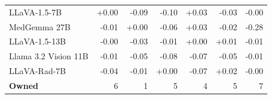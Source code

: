 \begin{table}[t]
{\begin{tabular}{lrrrrrr}
LLaVA-1.5-7B & \cellcolor{cfTerra1}+0.00 & \cellcolor{cfSlate2}-0.09 & \cellcolor{cfSlate2}-0.10 & \cellcolor{cfTerra2}+0.03 & \cellcolor{cfSlate2}-0.03 & \cellcolor{cfSlate1}-0.00 \\
MedGemma 27B & \cellcolor{cfSlate1}-0.01 & \cellcolor{cfTerra1}+0.00 & \cellcolor{cfSlate2}-0.06 & \cellcolor{cfTerra2}+0.03 & \cellcolor{cfSlate1}-0.02 & \cellcolor{cfSlate4}-0.28 \\
LLaVA-1.5-13B & \cellcolor{cfSlate1}-0.00 & \cellcolor{cfSlate2}-0.03 & \cellcolor{cfSlate1}-0.01 & \cellcolor{cfTerra1}+0.00 & \cellcolor{cfTerra1}+0.01 & \cellcolor{cfSlate1}-0.01 \\
Llama 3.2 Vision 11B & \cellcolor{cfSlate1}-0.01 & \cellcolor{cfSlate2}-0.05 & \cellcolor{cfSlate2}-0.08 & \cellcolor{cfSlate2}-0.07 & \cellcolor{cfSlate2}-0.05 & \cellcolor{cfSlate1}-0.01 \\
LLaVA-Rad-7B & \cellcolor{cfSlate2}-0.04 & \cellcolor{cfSlate1}-0.01 & \cellcolor{cfTerra1}+0.00 & \cellcolor{cfSlate2}-0.07 & \cellcolor{cfTerra2}+0.02 & \cellcolor{cfSlate1}-0.00 \\
\midrule
\textbf{Owned} & 6 & 1 & 5 & 4 & 5 & 7 \\
\bottomrule
\end{tabular}}
\end{table}

